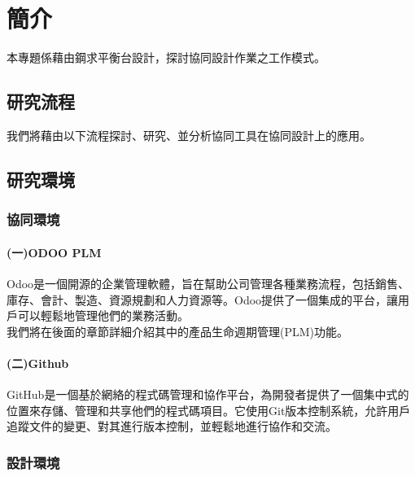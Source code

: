 \chapter{簡介}
\renewcommand{\baselinestretch}{10.0} %
\setcounter{page}{1}  %
\fontsize{14pt}{2.5pt}\sectionef

本專題係藉由鋼求平衡台設計，探討協同設計作業之工作模式。

\section{研究流程}
我們將藉由以下流程探討、研究、並分析協同工具在協同設計上的應用。\\


\section{研究環境}
\subsection{協同環境}

\subsubsection{(一)ODOO PLM}
\fontsize{14pt}{2.5pt}\sectionef\hspace{12pt} Odoo是一個開源的企業管理軟體，旨在幫助公司管理各種業務流程，包括銷售、庫存、會計、製造、資源規劃和人力資源等。Odoo提供了一個集成的平台，讓用戶可以輕鬆地管理他們的業務活動。\\
\fontsize{14pt}{2.5pt}\sectionef\hspace{12pt}
我們將在後面的章節詳細介紹其中的產品生命週期管理(PLM)功能。\\
\subsubsection{(二)Github}
GitHub是一個基於網絡的程式碼管理和協作平台，為開發者提供了一個集中式的位置來存儲、管理和共享他們的程式碼項目。它使用Git版本控制系統，允許用戶追蹤文件的變更、對其進行版本控制，並輕鬆地進行協作和交流。\\

\subsection{設計環境}

